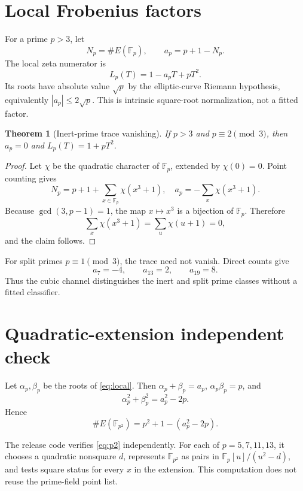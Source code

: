\documentclass[11pt]{article}
\newtheorem{theorem}{Theorem}[section]
\theoremstyle{remark}\newtheorem{remark}[theorem]{Remark}
\begin{document}
\section{Local Frobenius factors}
For a prime \(p>3\), let
\[
 N_p=\#E(\mathbb F_p),\qquad a_p=p+1-N_p.
\]
The local zeta numerator is
\begin{equation}\label{eq:local}
 L_p(T)=1-a_pT+pT^2.
\end{equation}
Its roots have absolute value \(\sqrt p\) by the elliptic-curve Riemann
hypothesis, equivalently \(|a_p|\le2\sqrt p\).  This is intrinsic
square-root normalization, not a fitted factor.

\begin{theorem}[Inert-prime trace vanishing]\label{thm:inert}
If \(p>3\) and \(p\equiv2\pmod3\), then \(a_p=0\) and
\(L_p(T)=1+pT^2\).
\end{theorem}
\begin{proof}
Let \(\chi\) be the quadratic character of \(\mathbb F_p\), extended by
\(\chi(0)=0\).  Point counting gives
\[
 N_p=p+1+\sum_{x\in\mathbb F_p}\chi(x^3+1),
 \quad
 a_p=-\sum_x\chi(x^3+1).
\]
Because \(\gcd(3,p-1)=1\), the map \(x\mapsto x^3\) is a bijection of
\(\mathbb F_p\).  Therefore
\[
 \sum_x\chi(x^3+1)=\sum_u\chi(u+1)=0,
\]
and the claim follows.
\end{proof}

For split primes \(p\equiv1\pmod3\), the trace need not vanish.  Direct
counts give
\[
a_7=-4,\qquad a_{13}=2,\qquad a_{19}=8.
\]
Thus the cubic channel distinguishes the inert and split prime classes
without a fitted classifier.

\section{Quadratic-extension independent check}
Let \(\alpha_p,\beta_p\) be the roots of \eqref{eq:local}.  Then
\(\alpha_p+\beta_p=a_p\), \(\alpha_p\beta_p=p\), and
\[
 \alpha_p^2+\beta_p^2=a_p^2-2p.
\]
Hence
\begin{equation}\label{eq:p2}
 \#E(\mathbb F_{p^2})=p^2+1-(a_p^2-2p).
\end{equation}

The release code verifies \eqref{eq:p2} independently.  For each of
\(p=5,7,11,13\), it chooses a quadratic nonsquare \(d\), represents
\(\mathbb F_{p^2}\) as pairs in \(\mathbb F_p[u]/(u^2-d)\), and tests square
status for every \(x\) in the extension.  This computation does not reuse
the prime-field point list.
\end{document}
